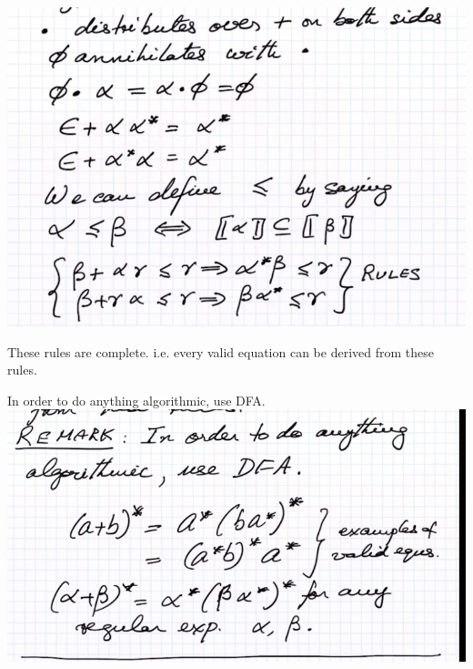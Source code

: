 \documentclass[class=scrartcl, crop=false]{standalone}
\begin{document}
\begin{definition}
  \includegraphics[width=\textwidth]{reg_rules}
  \begin{theorem}
    These rules are complete. i.e. every valid equation can be derived from
    these rules.
  \end{theorem}
  \begin{remark}
    In order to do anything algorithmic, use DFA. \\
    \includegraphics[width=\textwidth]{more_rules}
  \end{remark}
\end{definition}
\end{document}
